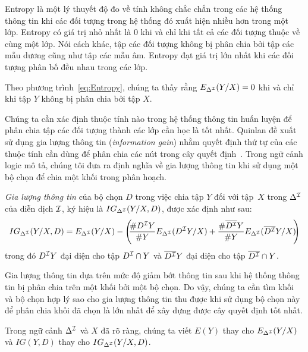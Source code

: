 Entropy là một lý thuyết độ đo về tính không chắc chắn trong các hệ thống thông tin khi các đối tượng trong hệ thống đó xuất hiện nhiều hơn trong một lớp. Entropy có giá trị nhỏ nhất là 0 khi và chỉ khi tất cả các đối tượng thuộc về cùng một lớp. Nói cách khác, tập các đối tượng không bị phân chia bởi tập các mẫu dương cũng như tập các mẫu âm.
Entropy đạt giá trị lớn nhất khi các đối tượng phân bố đều nhau trong các lớp.

\begin{Remark}
	Theo phương trình~\eqref{eq:Entropy}, chúng ta thấy rằng $E_{\Delta^{\mathcal{I}}}(Y/X) = 0$ khi và chỉ khi tập $Y$ không bị phân chia bởi tập $X$.\myend
\end{Remark}

Chúng ta cần xác định thuộc tính nào trong hệ thống thông tin huấn luyện để phân chia tập các đối tượng thành các lớp cần học là tốt nhất. Quinlan đề xuất sử dụng gia lượng thông tin ({\em information gain}) nhằm quyết định thứ tự của các thuộc tính cần dùng để phân chia các nút trong cây quyết định~\cite{Quinlan1986}. Trong ngữ cảnh logic mô tả, chúng tôi đưa ra định nghĩa về gia lượng thông tin khi sử dụng một bộ chọn để chia một khối trong phân hoạch.

\begin{Definition}
	{\em Gia lượng thông tin} của bộ chọn $D$ trong việc chia tập $Y$ đối với tập~$X$ trong $\Delta^{\mathcal{I}}$ của diễn dịch $\mathcal{I}$, ký hiệu là $IG_{\Delta^{\mathcal{I}}}(Y/X, D)$, được xác định như sau:
	\begin{equation}
		IG_{\Delta^{\mathcal{I}}}(Y/X, D) = E_{\Delta^{\mathcal{I}}}(Y/X)-
		\left(\!\!\frac{\# D^{\mathcal{I}} Y}{\# Y}E_{\Delta^{\mathcal{I}}}(D^{\mathcal{I}} Y/X)+\frac{\# \overline{D^{\mathcal{I}}}Y}{\# Y}E_{\Delta^{\mathcal{I}}}(\overline{D^{\mathcal{I}}}Y/X)\!\!\right)  \label{eq:InfoGain}
	\end{equation}
	trong đó $D^{\mathcal{I}} Y$ đại diện cho tập $D^{\mathcal{I}} \cap Y$ và $\overline{D^{\mathcal{I}}}Y$ đại diện cho tập $\overline{D^{\mathcal{I}}} \cap Y$.\myend
\end{Definition}

Gia lượng thông tin dựa trên mức độ giảm bớt thông tin sau khi hệ thống thông tin bị phân chia trên một khối bởi một bộ chọn. Do vậy, chúng ta cần tìm khối và bộ chọn hợp lý sao cho gia lượng thông tin thu được khi sử dụng bộ chọn này để phân chia khối đã chọn là lớn nhất để xây dựng được cây quyết định tốt nhất.

Trong ngữ cảnh $\Delta^{\mathcal{I}}$ và $X$ đã rõ ràng, chúng ta viết $E(Y)$ thay cho $E_{\Delta^{\mathcal{I}}}(Y/X)$ và $IG(Y, D)$ thay cho $IG_{\Delta^{\mathcal{I}}}(Y/X, D)$.

